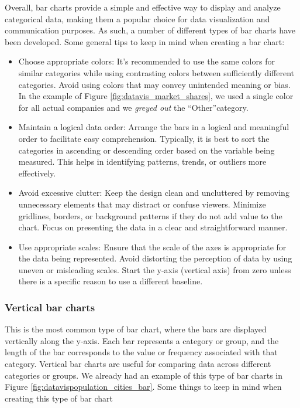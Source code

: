 \documentclass[10pt]{extarticle}
\newcommand{\<}{\langle}
\renewcommand{\>}{\rangle}
\theoremstyle{mystyle}{\newtheorem*{remark}{Remark}}
\theoremstyle{mystyle}{\newtheorem*{remarks}{Remarks}}
\theoremstyle{mystyle}{\newtheorem*{example}{Example}}
\theoremstyle{mystyle}{\newtheorem*{examples}{Examples}}
\theoremstyle{definition}{\newtheorem*{exercise}{Exercise}}
\theoremstyle{warn}
\begin{document}
Overall, bar charts provide a simple and effective way to display and analyze categorical data, making them a popular choice for data visualization and communication purposes. As such, a number of different types of bar charts have been developed. Some general tips to keep in mind when creating a bar chart:
\begin{itemize}
\item Choose appropriate colors: It's recommended to use the same colors for similar categories while using contrasting colors between sufficiently different categories. Avoid using colors that may convey unintended meaning or bias. In the example of Figure \ref{fig:datavis_market_shares}, we used a single color for all actual companies and we \textit{greyed out} the \textquotedblleft Other\textquotedblright  category.

\item Maintain a logical data order: Arrange the bars in a logical and meaningful order to facilitate easy comprehension. Typically, it is best to sort the categories in ascending or descending order based on the variable being measured. This helps in identifying patterns, trends, or outliers more effectively.

\item Avoid excessive clutter: Keep the design clean and uncluttered by removing unnecessary elements that may distract or confuse viewers. Minimize gridlines, borders, or background patterns if they do not add value to the chart. Focus on presenting the data in a clear and straightforward manner.

\item Use appropriate scales: Ensure that the scale of the axes is appropriate for the data being represented. Avoid distorting the perception of data by using uneven or misleading scales. Start the y-axis (vertical axis) from zero unless there is a specific reason to use a different baseline.
\end{itemize}

\subsubsection*{Vertical bar charts}
This is the most common type of bar chart, where the bars are displayed vertically along the y-axis. Each bar represents a category or group, and the length of the bar corresponds to the value or frequency associated with that category. Vertical bar charts are useful for comparing data across different categories or groups. We already had an example of this type of bar charts in Figure \ref{fig:datavispopulation_cities_bar}. Some things to keep in mind when creating this type of bar chart
\end{document}
